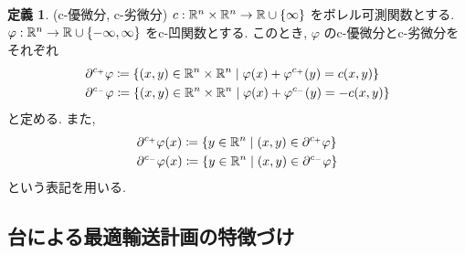 \documentclass[10pt, fleqn, label-section=none, titlepage]{bxjsarticle}
\theoremstyle{definition}
\newtheorem{dfn}{定義}[section]
\newcommand{\cbra}[1]{\mleft\{#1\mright\}}
\renewcommand{\;}{\, ; \,}
\begin{document}
\begin{dfn}(c-優微分, c-劣微分)
$c:\mathbb R ^n \times \mathbb R ^n \rightarrow \mathbb R \cup \cbra{\infty}$ をボレル可測関数とする. $\varphi:\mathbb R^n \rightarrow \mathbb R \cup \cbra{-\infty, \infty}$ をc-凹関数とする. このとき, $\varphi$ のc-優微分とc-劣微分をそれぞれ
\begin{align*} 
&\partial ^ {c_+} \varphi \coloneqq \cbra{(x,y) \in \mathbb R^n \times \mathbb R^n \mid \varphi (x)+ \varphi^{c_+} (y) = c(x,y)} \\
&\partial ^ {c_-} \varphi \coloneqq \cbra{(x,y) \in \mathbb R^n \times \mathbb R^n \mid \varphi (x)+ \varphi^{c_-} (y) = -c(x,y)} 
\end{align*}
と定める. また, 
\begin{align*} 
&\partial ^ {c_+} \varphi (x) \coloneqq \cbra{y  \in \mathbb R^n \mid (x,y) \in \partial^{c_+} \varphi} \\
&\partial ^ {c_-} \varphi (x) \coloneqq \cbra{y  \in \mathbb R^n \mid (x,y) \in \partial^{c_-} \varphi} 
\end{align*}
という表記を用いる.
\end{dfn}

\newpage
\subsection{台による最適輸送計画の特徴づけ}
\end{document}
